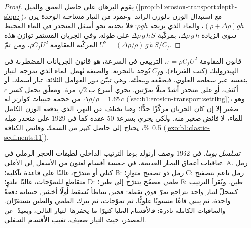 \begin{proof}
يقوم البرهان على حاصل العمق والميل (\cref{prop:b1:erosion-transport:depth-slope})، مع استبدال الوزن بالوزن الزائد. وعمود من التيار مساحته الوحدة يزن $(\rho +
\Delta\rho) g h$، والماء الذي يزيحه $\rho g h$: فلا يجذبه نحو أسفل المنحدر في الماء المحيط سوى الزيادة $\Delta\rho\,g\,h$، بمركّبة $\Delta\rho\,g\,h\,S$ على طوله. وفي الجريان المستقر توازن هذه المركّبة المقاومة $\rho C_f U^2$، ومن ثمّ $U^2 = (\Delta\rho/\rho)\,g\,h\,S/C_f$.
\end{proof}

قانون المقاومة $\tau = \rho C_f U^2$، التربيعي في السرعة، هو قانون الجريانات المضطربة في الهيدروليك (كتب الفيزياء)، و$C_f$ يُوجد بالتجربة. والصيغة تُهمل الماء الذي يمزجه التيار بنفسه عبر سطحه العلوي، فيخفّفه ويبطّئه. وهي تبيّن دور العوامل الثلاثة: تيار أسمك، أو أكثف، أو على منحدر أشدّ ميلًا بمرّتين، يجري أسرع ب$\sqrt 2$ مرة. ومعلّق يحمل كسر $c$ من حجمه حبيبات كوارتز له $\Delta\rho/\rho = 1.65\,c$ (\cref{sec:b1:erosion-transport:settling})، وهو صغير إلا إن كان الجريان مركّزًا جدًّا؛ وهنا يختلف  عن النهر، الذي يدفعه الوزن الكامل للماء، لا فائض صغير منه. ولكي يجري بسرعة 50 عقدة كما في 1929 على منحدر ميله \qty{0.5}{\percent}، يحتاج  إلى حاصل كبير من السمك وفائض الكثافة (\cref{exo:b1:clastic-sediments:11}).

\emph{تسلسل بوما.} في 1962 وصف أرنولد بوما الترتيب الداخلي لطبقات الحجر الرملي في تعاقبات أعماق البحار القديمة، في خمسة أقسام تُعنون من الأسفل إلى الأعلى. A: رمل كتلي أو متدرّج، غالبًا على قاعدة تآكلية؛ B: رمل ذو تصفيح متوازٍ؛ C: رمل ناعم بتصفيح متقاطع للتموّجات، غالبًا ملتوٍ؛ D: طمي مصفّح يتدرّج إلى طين؛ E: طين. ويُقرأ الترتيب كسجلّ لتيار واحد يتراجع يمرّ فوق نقطة: فحين يتباطأ يُسقط أولًا أخشن حبيباته دفعةً واحدة، ثم يبني قاعًا مستويًا علويًّا، ثم تموّجات، ثم يترك الطمي والطين يستقرّان. والتعاقبات الكاملة نادرة: فالأقسام العليا كثيرًا ما يحفرها التيار التالي، وبعيدًا عن المصدر، حيث التيار ضعيف، تغيب الأقسام السفلى.

